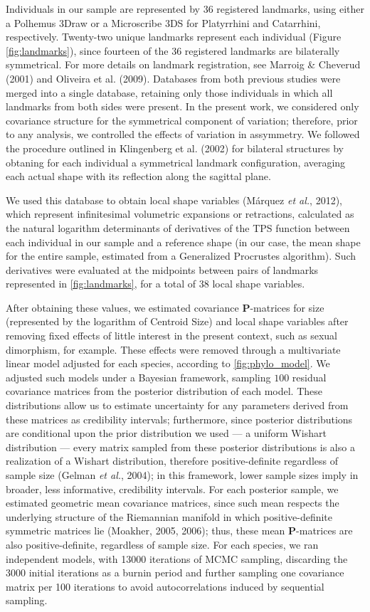 \documentclass[12pt,twoside]{report}
\begin{document}
Individuals in our sample are represented by 36 registered landmarks,
using either a Polhemus 3Draw or a Microscribe 3DS for Platyrrhini and
Catarrhini, respectively. Twenty-two unique landmarks represent each
individual (Figure \ref{fig:landmarks}), since fourteen of the 36
registered landmarks are bilaterally symmetrical. For more details on
landmark registration, see Marroig \& Cheverud (2001) and Oliveira et
al. (2009). Databases from both previous studies were merged into a
single database, retaining only those individuals in which all landmarks
from both sides were present. In the present work, we considered only
covariance structure for the symmetrical component of variation;
therefore, prior to any analysis, we controlled the effects of variation
in assymmetry. We followed the procedure outlined in Klingenberg et al.
(2002) for bilateral structures by obtaning for each individual a
symmetrical landmark configuration, averaging each actual shape with its
reflection along the sagittal plane.

We used this database to obtain local shape variables (Márquez \emph{et
al.}, 2012), which represent infinitesimal volumetric expansions or
retractions, calculated as the natural logarithm determinants of
derivatives of the TPS function between each individual in our sample
and a reference shape (in our case, the mean shape for the entire
sample, estimated from a Generalized Procrustes algorithm). Such
derivatives were evaluated at the midpoints between pairs of landmarks
represented in \autoref{fig:landmarks}, for a total of 38 local shape
variables.

After obtaining these values, we estimated covariance
$\mathbf{P}$-matrices for size (represented by the logarithm of Centroid
Size) and local shape variables after removing fixed effects of little
interest in the present context, such as sexual dimorphism, for example.
These effects were removed through a multivariate linear model adjusted
for each species, according to \autoref{fig:phylo_model}. We adjusted
such models under a Bayesian framework, sampling $100$ residual
covariance matrices from the posterior distribution of each model. These
distributions allow us to estimate uncertainty for any parameters
derived from these matrices as credibility intervals; furthermore, since
posterior distributions are conditional upon the prior distribution we
used --- a uniform Wishart distribution --- every matrix sampled from
these posterior distributions is also a realization of a Wishart
distribution, therefore positive-definite regardless of sample size
(Gelman \emph{et al.}, 2004); in this framework, lower sample sizes
imply in broader, less informative, credibility intervals. For each
posterior sample, we estimated geometric mean covariance matrices, since
such mean respects the underlying structure of the Riemannian manifold
in which positive-definite symmetric matrices lie (Moakher, 2005, 2006);
thus, these mean $\mathbf{P}$-matrices are also positive-definite,
regardless of sample size. For each species, we ran independent models,
with 13000 iterations of MCMC sampling, discarding the 3000 initial
iterations as a burnin period and further sampling one covariance matrix
per 100 iterations to avoid autocorrelations induced by sequential
sampling.
\end{document}
